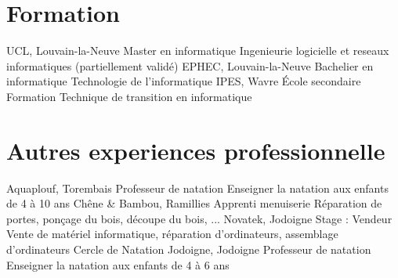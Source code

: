 \documentclass[%
    doublesided,
    paper=a4,
    fontsize=10pt,
    hidelinks
]{my-resume}
\begin{document}
{        \section[\faMortarBoard]{Formation}
        {UCL, Louvain-la-Neuve}
        {Master en informatique}
        {Ingenieurie logicielle et reseaux informatiques (partiellement validé)}
        {EPHEC, Louvain-la-Neuve}
        {Bachelier en informatique}
        {Technologie de l'informatique}
        {IPES, Wavre}
        {École secondaire}
        {Formation Technique de transition en informatique}

        \section[\faGears]{Autres experiences professionnelle}
        {Aquaplouf, Torembais}
        {Professeur de natation}
        {Enseigner la natation aux enfants de 4 à 10 ans}
        {Chêne \& Bambou, Ramillies}
        {Apprenti menuiserie}
        {Réparation de portes, ponçage du bois, découpe du bois, ...}
        {Novatek, Jodoigne}
        {Stage : Vendeur}
        {Vente de matériel informatique, réparation d'ordinateurs, assemblage d'ordinateurs}
        {Cercle de Natation Jodoigne, Jodoigne}
        {Professeur de natation}
        {Enseigner la natation aux enfants de 4 à 6 ans}

    }
    \makebody
\end{document}
